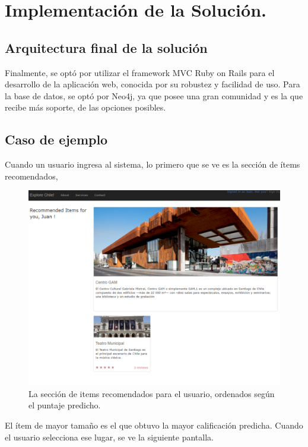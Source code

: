\chapter{Implementaci\'on de la Solución.}

\section{Arquitectura final de la solución}

Finalmente, se optó por utilizar el framework MVC Ruby on Rails para el desarrollo de la aplicación web, conocida por su robustez y facilidad de uso.
Para la base de datos, se optó por Neo4j, ya que posee una gran comunidad y es la que recibe más soporte, de las opciones posibles. 


\section{Caso de ejemplo}

Cuando un usuario ingresa al sistema, lo primero que se ve es la sección de ítems recomendados, 

\begin{figure}[hbtp]
\centering
\includegraphics[scale=0.7]{images/screen2.png}
\caption{La sección de items recomendados para el usuario, ordenados según el puntaje predicho.}
\end{figure} 

El ítem de mayor tamaño es el que obtuvo la mayor calificación predicha. Cuando el usuario selecciona ese lugar, se ve la siguiente pantalla.

